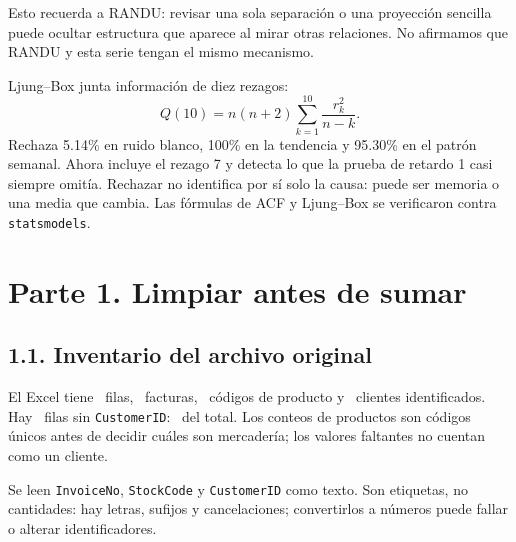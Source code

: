 \documentclass[11pt,letterpaper]{article}
\begin{document}
Esto recuerda a RANDU: revisar una sola separación o una proyección sencilla puede ocultar estructura que aparece al mirar otras relaciones. No afirmamos que RANDU y esta serie tengan el mismo mecanismo.

Ljung--Box junta información de diez rezagos:
\[
Q(10)=n(n+2)\sum_{k=1}^{10}\frac{r_k^2}{n-k}.
\]
Rechaza 5.14\% en ruido blanco, 100\% en la tendencia y 95.30\% en el patrón semanal. Ahora incluye el rezago 7 y detecta lo que la prueba de retardo 1 casi siempre omitía. Rechazar no identifica por sí solo la causa: puede ser memoria o una media que cambia. Las fórmulas de ACF y Ljung--Box se verificaron contra \texttt{statsmodels}.

\section{Parte 1. Limpiar antes de sumar}
\subsection{1.1. Inventario del archivo original}
El Excel tiene \FilasOriginal\ filas, \FacturasOriginal\ facturas, \ProductosOriginal\ códigos de producto y \ClientesOriginal\ clientes identificados. Hay \SinClienteOriginal\ filas sin \texttt{CustomerID}: \PorcentajeAnonimos\ del total. Los conteos de productos son códigos únicos antes de decidir cuáles son mercadería; los valores faltantes no cuentan como un cliente.

Se leen \texttt{InvoiceNo}, \texttt{StockCode} y \texttt{CustomerID} como texto. Son etiquetas, no cantidades: hay letras, sufijos y cancelaciones; convertirlos a números puede fallar o alterar identificadores.
\end{document}
